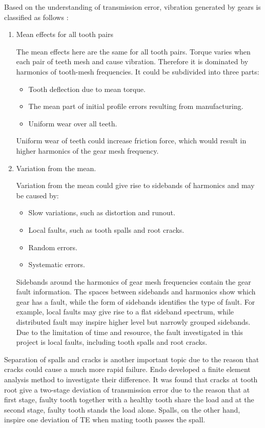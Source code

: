 Based on the understanding of transmission error, vibration generated by gears is classified as follows \cite{vbcm}:
\begin{enumerate}
\item Mean effects for all tooth pairs

The mean effects here are the same for all tooth pairs. Torque varies when each pair of teeth mesh and cause vibration. Therefore it is dominated by harmonics of tooth-mesh frequencies. It could be subdivided into three parts: 
\begin{itemize}
\item Tooth deflection due to mean torque.		
\item The mean part of initial profile errors resulting from manufacturing.		
\item Uniform wear over all teeth.
\end{itemize}
Uniform wear of teeth could increase friction force, which would result in higher harmonics of the gear mesh frequency.

\item Variation from the mean.

Variation from the mean could give rise to sidebands of harmonics and may be caused by:
\begin{itemize}
\item Slow variations, such as distortion and runout.		
\item Local faults, such as tooth spalls and root cracks.		
\item Random errors.		
\item Systematic errors.
\end{itemize}

Sidebands around the harmonics of gear mesh frequencies contain the gear fault information. The spaces between sidebands and harmonics show which gear has a fault, while the form of sidebands identifies the type of fault. For example, local faults may give rise to a flat sideband spectrum, while distributed fault may inspire higher level but narrowly grouped sidebands. 
Due to the limitation of time and resource, the fault investigated in this project is local faults, including tooth spalls and root cracks.
\end{enumerate}

Separation of spalls and cracks is another important topic due to the reason that cracks could cause a much more rapid failure. Endo \cite{Endo} developed a finite element analysis method to investigate their difference. It was found that cracks at tooth root give a two-stage deviation of transmission error due to the reason that at first stage, faulty tooth together with a healthy tooth share the load and at the second stage, faulty tooth stands the load alone. Spalls, on the other hand, inspire one deviation of TE when mating tooth passes the spall.  

